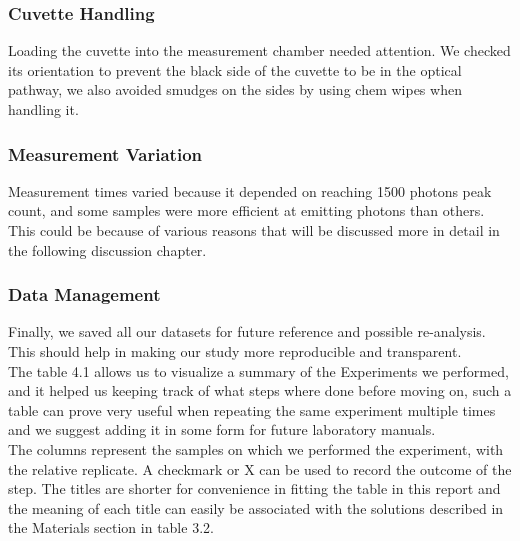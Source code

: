 \documentclass[a4paper,english,12pt,bibliography=totoc]{scrreprt}
\begin{document}
\subsubsection{Cuvette Handling}
Loading the cuvette into the measurement chamber needed attention. We checked its orientation to prevent the black side of the cuvette to be in the optical pathway, we also avoided smudges on the sides by using chem wipes when handling it.\\
\subsubsection{Measurement Variation}
Measurement times varied because it depended on reaching 1500 photons peak count, and some samples were more efficient at emitting photons than others. This could be because of various reasons that will be discussed more in detail in the following discussion chapter.\\
\subsubsection{Data Management}
Finally, we saved all our datasets for future reference and possible re-analysis. This should help in making our study more reproducible and transparent.
\\
The table 4.1 allows us to visualize a summary of the Experiments we performed, and it helped us keeping track of what steps where done before moving on, such a table can prove very useful when repeating the same experiment multiple times and we suggest adding it in some form for future laboratory manuals.\\

The columns represent the samples on which we performed the experiment, with the relative replicate. A checkmark or X can be used to record the outcome of the step. The titles are shorter for convenience in fitting the table in this report and the meaning of each title can easily be associated with the solutions described in the Materials section in table 3.2.
\end{document}
